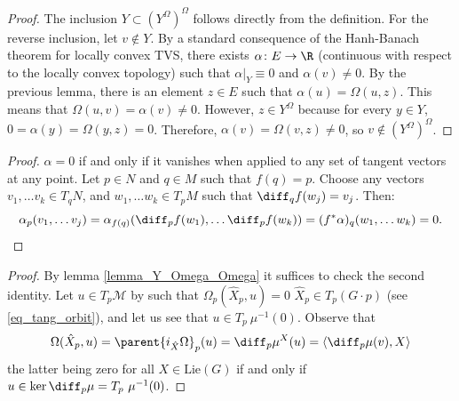 \begin{proof}
    The inclusion \(Y \subset (Y^\Omega)^\Omega\) follows directly from the definition. For the reverse inclusion, let \(v \notin Y\). By a standard consequence of the Hanh-Banach theorem for locally convex TVS, there exists \(\alpha \colon E \to \R\) (continuous with respect to the locally convex topology) such that \(\alpha|_Y\equiv0\) and \(\alpha(v) \neq 0\). By the previous lemma, there is an element \(z \in E\) such that \(\alpha(u)=\Omega(u,z)\). This means that \(\Omega(u,v)=\alpha(v) \neq 0\). However, \(z \in Y^\Omega\) because for every \(y \in Y\), \(0=\alpha(y)=\Omega(y,z)=0\). Therefore, \(\alpha(v)=\Omega(v,z) \neq 0\), so \(v \notin (Y^\Omega)^\Omega\).
\end{proof}

\begin{proof}
    \(\alpha=0\) if and only if it vanishes when applied to any set of tangent vectors at any point. Let \(p \in N\) and \(q \in M\) such that \(f(q)=p\). Choose any vectors \(v_1, \ldots v_k \in T_qN\), and \(w_1, \ldots w_k \in T_pM\) such that \(\diff_qf(w_j)=v_j\). Then:
    \[
    \alpha_p(v_1, \ldots v_j)=\alpha_{f(q)}(\diff_pf(w_1), \ldots \diff_pf(w_k))=(f^*\alpha)_q(w_1, \ldots w_k)=0.
    \]
\end{proof}

\begin{proof}
    By lemma \ref{lemma_Y_Omega_Omega} it suffices to check the second identity. Let \(u \in T_p \mathcal{M}\) by such that \(\Omega_p(\hat{X}_p, u)=0\) \(\hat{X}_p \in T_p(G  \cdot p)\) (see \eqref{eq_tang_orbit}), and let us see that \(u\in T_p \ \mu^{-1}(0)\). Observe that
    \[
    \Omega(\hat{X}_p, u)=\parent{i_{\hat{X}}\Omega}_p(u)=\diff_p \mu^X(u)=\langle \diff _p \mu (v), X \rangle
    \]
    the latter being zero for all \(X \in \mathrm{Lie}(G)\) if and only if \(u\in \ker \diff_p\mu=T_p \ \mu^{-1}(0)\).
\end{proof}

